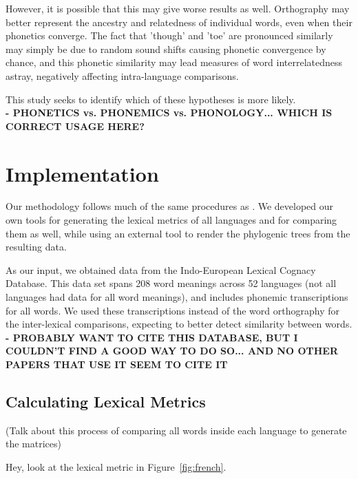 \documentclass[10pt,a4]{article}
\begin{document}
However, it is possible that this may give worse results as well.  Orthography may better represent the ancestry and relatedness of individual words, even when their phonetics converge.  The fact that 'though' and 'toe' are pronounced similarly may simply be due to random sound shifts causing phonetic convergence by chance, and this phonetic similarity may lead measures of word interrelatedness astray, negatively affecting intra-language comparisons. 

This study seeks to identify which of these hypotheses is more likely. \\

\textbf{- PHONETICS vs. PHONEMICS vs. PHONOLOGY... WHICH IS CORRECT USAGE HERE?}

\section{Implementation}

Our methodology follows much of the same procedures as .  We developed our own tools for generating the lexical metrics of all languages and for comparing them as well, while using an external tool to render the phylogenic trees from the resulting data.

As our input, we obtained data from the Indo-European Lexical Cognacy Database.  This data set spans 208 word meanings across 52 languages (not all languages had data for all word meanings), and includes phonemic transcriptions for all words.  We used these transcriptions instead of the word orthography for the inter-lexical comparisons, expecting to better detect similarity between words.\\

\textbf{- PROBABLY WANT TO CITE THIS DATABASE, BUT I COULDN'T FIND A GOOD WAY TO DO SO... AND NO OTHER PAPERS THAT USE IT SEEM TO CITE IT}\\

\subsection{Calculating Lexical Metrics}

(Talk about this process of comparing all words inside each language to generate the matrices)

Hey, look at the lexical metric in Figure~\ref{fig:french}.
\end{document}

